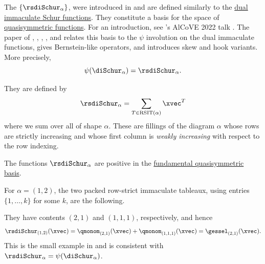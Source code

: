 The 
\label{rowStrictDualImmaculateSchurFunction}
$\{\rsdiSchur_\alpha\}$, were introduced in
\cite{NieseSundaramWilligenburgVegaWang2023} and are defined similarly to the
\hyperref[diSchur]{dual immaculate Schur functions}.
They constitute a basis for the space of
\hyperref[quasiSymmetricFunctions]{quasisymmetric functions}.
For an introduction, see 's AlCoVE 2022 talk
\cite{Sundaram2022AlCoVE}.
The paper of , ,
, , and 
relates this basis to the $\psi$ involution on the dual immaculate functions,
gives Bernstein-like operators, and introduces skew and hook variants.
More precisely,
\[
  \psi(\diSchur_\alpha)=\rsdiSchur_\alpha.
\]


They are defined by
\[
 \rsdiSchur_\alpha = \sum_{T \in \mathrm{RSIT}(\alpha)} \xvec^T
\]
where we sum over all
\label{rowStrictImmaculateTableau} of
shape $\alpha$.
These are fillings of the diagram $\alpha$ whose rows are strictly increasing
and whose first column is \emph{weakly increasing} with respect to the row
indexing.

The functions $\rsdiSchur_\alpha$ are positive in the
\hyperref[gessel]{fundamental quasisymmetric basis}.

\begin{example*}
For $\alpha=(1,2)$, the two packed row-strict immaculate tableaux, using
entries $\{1,\dotsc,k\}$ for some $k$, are the following.
\begin{figure}
\end{figure}
They have contents $(2,1)$ and $(1,1,1)$, respectively, and hence
\[
  \rsdiSchur_{(1,2)}(\xvec)
  = \qmonom_{(2,1)}(\xvec)+\qmonom_{(1,1,1)}(\xvec)
  = \gessel_{(2,1)}(\xvec).
\]
This is the small example in \cite[Ex.~3.10]{NieseSundaramWilligenburgVegaWang2023}
and is consistent with
$\rsdiSchur_\alpha=\psi(\diSchur_\alpha)$.
\end{example*}

